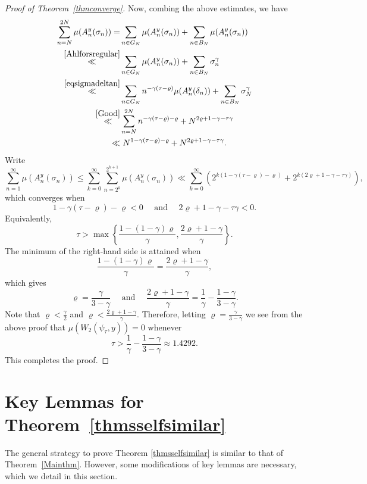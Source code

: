 \documentclass[amssymb,amsfonts,refcheck,12pt,verbatim,righttag]{amsart}
\numberwithin{equation}{section} %
\theoremstyle{plain}
\begin{document}
\begin{proof}[Proof of Theorem~\ref{thmconverge}]
Now, combing the above estimates, we have 
\[
	\begin{aligned}
		\sum_{n = N}^{2N}\mu (A_{n}^{y}(\sigma_{n}))
		=&\sum_{n\in G_N}\mu (A_{n}^{y}(\sigma_{n}))+\sum_{n\in B_N}\mu (A_{n}^{y}(\sigma_{n})) \\
\stackrel{\eqref{Ahlforsregular}}{\ll}&\sum_{n\in G_N}\mu (A_{n}^{y}(\sigma_{n}))+\sum_{n\in B_N}\sigma_n^{\gamma}\\
\stackrel{\eqref{eqsigmadeltan}}{\ll} &\sum_{n\in G_N}n^{-\gamma(\tau-\varrho)}\mu (A_{n}^{y}(\delta_{n}))
		+ \sum_{n\in B_N}\sigma_{N}^{\gamma}\\
\stackrel{\eqref{Good}}{\ll} & \sum_{n = N}^{2N}n^{-\gamma(\tau-\varrho)-\varrho}
		+ N^{2\varrho+1-\gamma-\tau\gamma}\\
		\ll &\  N^{1-\gamma(\tau-\varrho)-  \varrho}+N^{2\varrho+1-\gamma-\tau\gamma}.
	\end{aligned}
	\]
	Write
	\[
	\sum_{n = 1}^{\infty}\mu (A_{n}^{y}(\sigma_{n}))
	\leqslant \sum_{k = 0}^{\infty}\sum_{n = 2^{k}}^{2^{k + 1}}\mu (A_{n}^{y}(\sigma_{n}))\ll\sum_{k = 0}^{\infty}(2^{k(1-\gamma(\tau-\varrho)- \varrho)}+2^{k(2\varrho+1-\gamma-\tau\gamma)}),
	\]
	which converges when
	\[1-\gamma(\tau-\varrho)-\varrho<0\quad \text{ and } \quad  2\varrho+1-\gamma-\tau\gamma<0.\]
	Equivalently,
	\[\tau>\max\left\{\frac{1-(1-\gamma)\varrho}{\gamma}, \frac{2\varrho+1-\gamma}{\gamma}\right\}.\]
The minimum of the right-hand side is attained when
	\[\frac{1-(1-\gamma)\varrho}{\gamma}=\frac{2\varrho+1-\gamma}{\gamma},\]
	which gives
	\[\varrho =\frac{\gamma}{3-\gamma} \quad \text{ and } \quad \frac{2\varrho+1-\gamma}{\gamma}=\frac{1}{\gamma}-\frac{1-\gamma}{3-\gamma}.\]
	Note that $\varrho<\frac{\gamma}{2}$ and 
$\varrho<\frac{2\varrho+1-\gamma}{\gamma}$. Therefore, letting $\varrho =\frac{\gamma}{3-\gamma}$ we see from the above proof that  $\mu(W_{2}(\psi_{\tau},y))=0$ whenever 
\[\tau>\frac{1}{\gamma}-\frac{1-\gamma}{3-\gamma}\approx 1.4292.\]
This completes the proof.
\end{proof}

\section{Key Lemmas for Theorem~\ref{thmsselfsimilar}}\label{Sec:KL}
The general strategy to prove Theorem \ref{thmsselfsimilar} is similar to that of Theorem~\ref{Mainthm}. However, some modifications of key lemmas are necessary, which we detail in this section.
 
\end{document}
